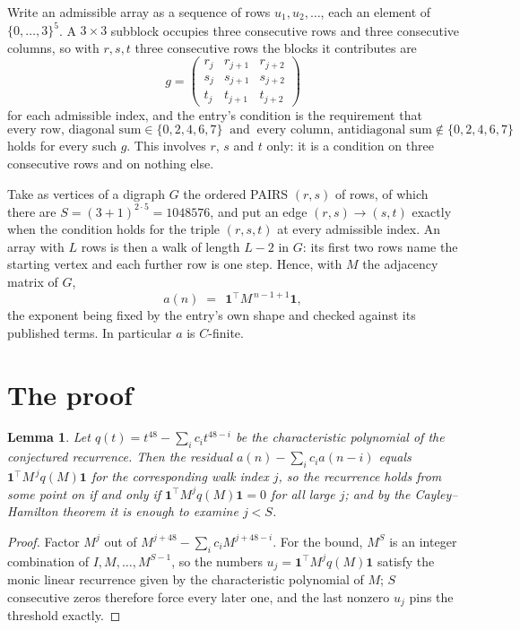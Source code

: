 \documentclass[11pt,a4paper]{article}
\theoremstyle{plain}
\newtheorem{lemma}[theorem]{Lemma}
\theoremstyle{definition}
\begin{document}
Write an admissible array as a sequence of rows $u_1,u_2,\dots$, each an element of
$\{0,\dots,3\}^{5}$. A $3\times3$ subblock occupies three consecutive rows and
three consecutive columns, so with $r,s,t$ three consecutive rows the blocks it
contributes are
\[
g=\begin{pmatrix}r_j&r_{j+1}&r_{j+2}\\ s_j&s_{j+1}&s_{j+2}\\ t_j&t_{j+1}&t_{j+2}\end{pmatrix}
\]
for each admissible index, and the entry's condition is the requirement that
\[
\text{every row, diagonal sum} \in \{0,2,4,6,7\}\ \text{ and }\ \text{every column, antidiagonal sum} \notin \{0,2,4,6,7\}
\]
holds for every such $g$. This involves $r$, $s$ and $t$ only: it is a condition on
three consecutive rows and on nothing else.

Take as vertices of a digraph $G$ the ordered PAIRS $(r,s)$ of rows, of which there are
$S=(3+1)^{2\cdot5}=1048576$, and put an edge $(r,s)\to(s,t)$ exactly when the condition
holds for the triple $(r,s,t)$ at every admissible index. An array with $L$ rows is then a
walk of length $L-2$ in $G$: its first two rows name the starting vertex and each further
row is one step. Hence, with $M$ the adjacency matrix of $G$,
\[
a(n)\;=\;\,\mathbf{1}^{\!\top}M^{\,n-1+1}\mathbf{1},
\]
the exponent being fixed by the entry's own shape and checked against its published terms.
In particular $a$ is $C$-finite.

\section{The proof}

\begin{lemma}\label{lem:crit}
Let $q(t)=t^{48}-\sum_i c_it^{48-i}$ be the characteristic polynomial of the
conjectured recurrence. Then the residual $a(n)-\sum_ic_ia(n-i)$ equals
$\mathbf{1}^{\!\top}M^{\,j}q(M)\mathbf{1}$ for the corresponding walk index
$j$, so the recurrence holds from some point on if and only if
$\mathbf{1}^{\!\top}M^{j}q(M)\mathbf{1}=0$ for all large $j$; and by the
Cayley--Hamilton theorem it is enough to examine $j<S$.
\end{lemma}

\begin{proof}
Factor $M^{j}$ out of $M^{j+48}-\sum_ic_iM^{j+48-i}$. For the bound, $M^{S}$
is an integer combination of $I,M,\dots,M^{S-1}$, so the numbers
$u_j=\mathbf{1}^{\!\top}M^{j}q(M)\mathbf{1}$ satisfy the monic linear recurrence given by
the characteristic polynomial of $M$; $S$ consecutive zeros therefore force every later one,
and the last nonzero $u_j$ pins the threshold exactly.
\end{proof}
\end{document}
